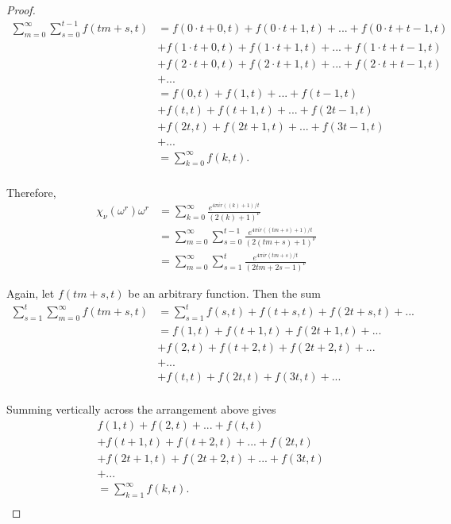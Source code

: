 \documentclass[../article.tex]{subfiles}
\begin{document}
\begin{proof}
\begin{equation}
\begin{split}
\sum_{m=0}^{\infty} \sum_{s=0}^{t-1} f(tm+s,t) &= f(0 \cdot t + 0, t) + f(0 \cdot t +1, t) + ... + f(0 \cdot t + t-1, t) \\
&+ f(1 \cdot t + 0, t) + f(1 \cdot t + 1,t ) + ... + f(1 \cdot t + t-1, t) \\
&+ f(2 \cdot t + 0, t) + f(2 \cdot t +1, t) + ... + f(2 \cdot t + t-1, t) \\
&+ ... \\
&= f(0, t) + f(1, t) + ... + f(t-1, t) \\
&+ f(t, t) + f(t+1, t) + ... + f(2t-1, t) \\
&+f(2t, t) + f(2t +1, t) + ...+ f(3t-1, t) \\
&+... \\
&= \sum_{k=0}^{\infty} f(k,t). \\
\end{split}
\end{equation}

Therefore,
\begin{equation}
\begin{split}
\chi_{\nu}(\omega^r)\omega^r &= \sum_{k=0}^{\infty} \frac{e^{4 \pi ir((k)+1)/t}}{(2(k)+1)^{\nu}} \\
&= \sum_{m=0}^{\infty} \sum_{s=0}^{t-1}  \frac{e^{4 \pi ir((tm+s) +1)/t}}{(2(tm+s)+1)^{\nu}} \\
&= \sum_{m=0}^{\infty} \sum_{s=1}^{t}  \frac{e^{4 \pi ir(tm+s)/t}}{(2tm+2s-1)^{\nu}} \
\end{split}
\end{equation}

Again, let $f(tm + s, t)$ be an arbitrary function. Then the sum
\begin{equation}
\begin{split}
\sum_{s=1}^{t} \sum_{m=0}^{\infty} f(tm+s, t) &= \sum_{s=1}^{t} {f(s,t) + f(t+s,t) + f(2t +s, t) + ...} \\
&= f(1,t) + f(t+1,t) + f(2t+1,t) + ... \\
&+ f(2,t) + f(t+2,t) + f(2t+2,t) + ... \\
&+ ... \\
&+ f(t,t) + f(2t,t) +f(3t, t) + ... \\
\end{split}
\end{equation}

Summing vertically across the arrangement above gives
\begin{equation}
\begin{split}
&f(1, t) + f(2, t) + ... + f(t, t) \\
&+ f(t+1, t) + f(t+2, t) + ... + f(2t, t) \\
&+f(2t+1, t) + f(2t +2, t) + ...+ f(3t, t) \\
&+... \\
&= \sum_{k=1}^{\infty} f(k,t). \\
\end{split}
\end{equation}


\end{proof}
\end{document}
